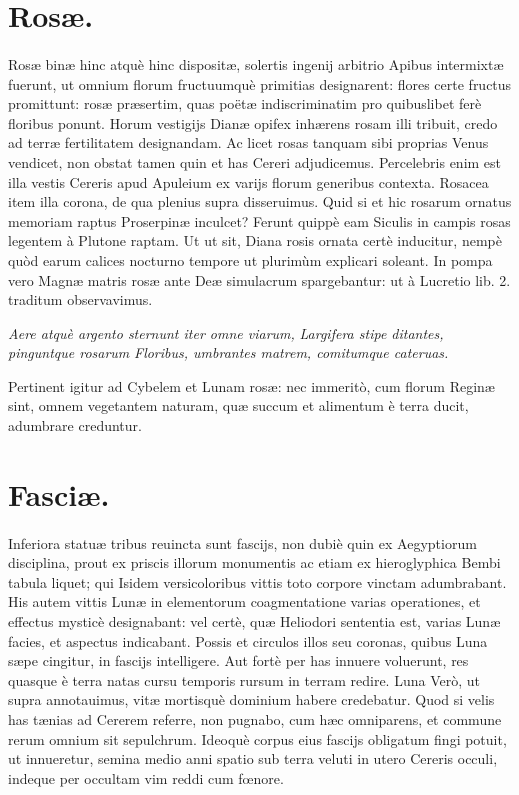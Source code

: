 \documentclass[a4paper, 11pt, oneside, polutonikogreek, latin]{article}
\begin{document}
\section{Rosæ.}
\paragraph{}
Rosæ binæ hinc atquè hinc dispositæ, solertis ingenij arbitrio Apibus intermixtæ fuerunt, ut omnium florum fructuumquè primitias designarent: flores certe fructus promittunt: rosæ præsertim, quas poëtæ indiscriminatim pro quibuslibet ferè floribus ponunt. Horum vestigijs Dianæ opifex inhærens rosam illi tribuit, credo ad terræ fertilitatem designandam. Ac licet rosas tanquam sibi proprias Venus vendicet, non obstat tamen quin et has Cereri adjudicemus. Percelebris enim est illa vestis Cereris apud Apuleium ex varijs florum generibus contexta. Rosacea item illa corona, de qua plenius supra disseruimus. Quid si et hic rosarum ornatus memoriam raptus Proserpinæ inculcet? Ferunt quippè eam Siculis in campis rosas legentem à Plutone raptam. Ut ut sit, Diana rosis ornata certè inducitur, nempè quòd earum calices nocturno tempore ut plurimùm explicari soleant. In pompa vero Magnæ matris rosæ ante Deæ simulacrum spargebantur: ut à Lucretio lib. 2. traditum observavimus.

\emph{Aere atquè argento sternunt iter omne viarum,}
\emph{Largifera stipe ditantes, pinguntque rosarum}
\emph{Floribus, umbrantes matrem, comitumque cateruas.}

Pertinent igitur ad Cybelem et Lunam rosæ: nec immeritò, cum florum Reginæ sint, omnem vegetantem naturam, quæ succum et alimentum è terra ducit, adumbrare creduntur.
\clearpage
\section{Fasciæ.}
\paragraph{}
Inferiora statuæ tribus reuincta sunt fascijs, non dubiè quin ex Aegyptiorum disciplina, prout ex priscis illorum monumentis ac etiam ex hieroglyphica Bembi tabula liquet; qui Isidem versicoloribus vittis toto corpore vinctam adumbrabant. His autem vittis Lunæ in elementorum coagmentatione varias operationes, et effectus mysticè designabant: vel certè, quæ Heliodori sententia est, varias Lunæ facies, et aspectus indicabant. Possis et circulos illos seu coronas, quibus Luna sæpe cingitur, in fascijs intelligere. Aut fortè per has innuere voluerunt, res quasque è terra natas cursu temporis rursum in terram redire. Luna Verò, ut supra annotauimus, vitæ mortisquè dominium habere credebatur. Quod si velis has tænias ad Cererem referre, non pugnabo, cum hæc omniparens, et commune rerum omnium sit sepulchrum. Ideoquè corpus eius fascijs obligatum fingi potuit, ut innueretur, semina medio anni spatio sub terra veluti in utero Cereris occuli, indeque per occultam vim reddi cum fœnore.
\end{document}
